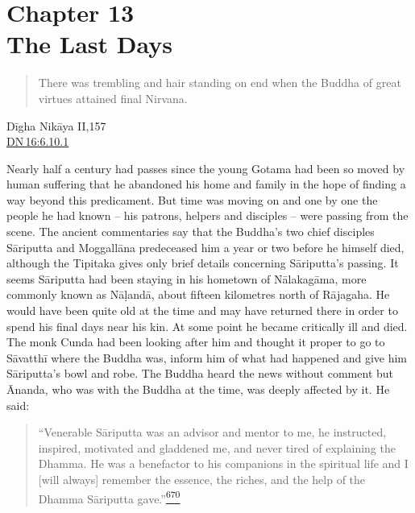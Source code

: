 \label{footprints_split_016.html_calibre_pb_33}

\label{footprints_split_017.html}{}

\section{\texorpdfstring{{Chapter 13}\\
The Last
Days}{Chapter 13 The Last Days}}\label{footprints_split_017.html_TOCTarget13}

\begin{quote}
There was trembling and hair standing on end when the Buddha of great
virtues attained final Nirvana.
\end{quote}

Dīgha Nikāya II,157\\
\href{https://suttacentral.net/dn16/en/sujato\#6.10.1}{DN\,16:6.10.1}

Nearly half a century had passes since the young Gotama had been so
moved by human suffering that he abandoned his home and family in the
hope of finding a way beyond this predicament. But time was moving on
and one by one the people he had known -- his patrons, helpers and
disciples -- were passing from the scene. The ancient commentaries say
that the Buddha's two chief disciples Sāriputta and Moggallāna
predeceased him a year or two before he himself died, although the
Tipitaka gives only brief details concerning Sāriputta's passing. It
seems Sāriputta had been staying in his hometown of Nālakagāma, more
commonly known as Nāḷandā, about fifteen kilometres north of Rājagaha.
He would have been quite old at the time and may have returned there in
order to spend his final days near his kin. At some point he became
critically ill and died. The monk Cunda had been looking after him and
thought it proper to go to Sāvatthī where the Buddha was, inform him of
what had happened and give him Sāriputta's bowl and robe. The Buddha
heard the news without comment but Ānanda, who was with the Buddha at
the time, was deeply affected by it. He said:

\begin{quote}
``Venerable Sāriputta was an advisor and mentor to me, he instructed,
inspired, motivated and gladdened me, and never tired of explaining the
Dhamma. He was a benefactor to his companions in the spiritual life and
I {[}will always{]} remember the essence, the riches, and the help of
the Dhamma Sāriputta
gave.''\label{footprints_split_017.html_fnref670}\hyperref[footprints_split_025.htmlux5cux23fn670]{\textsuperscript{670}}
\end{quote}

